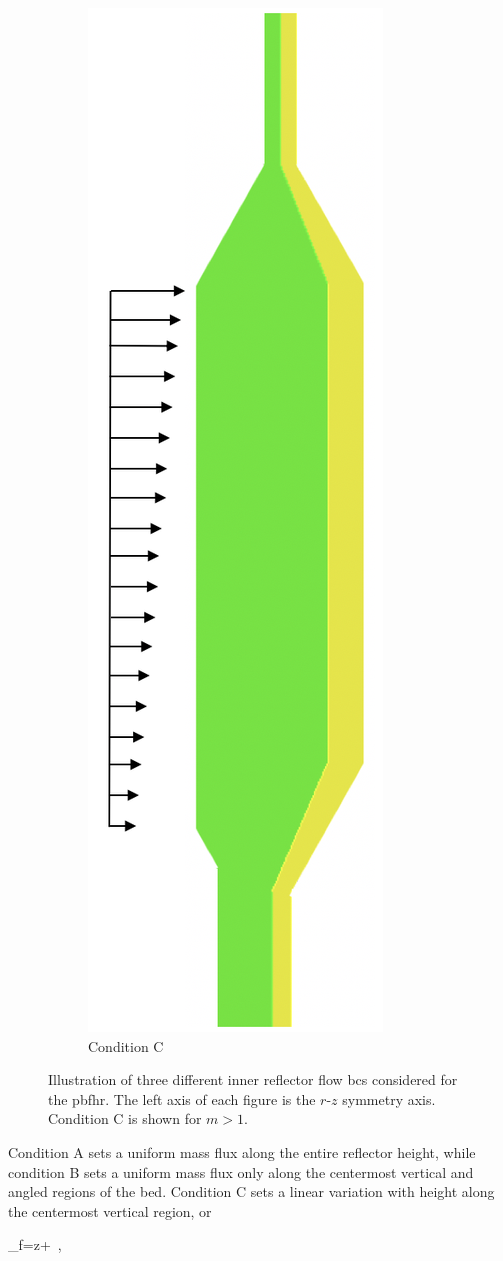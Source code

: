 \begin{figure}[!htb]
\begin{subfigure}{.32\textwidth}
  \includegraphics[height=1.5\linewidth]{figs/bc_C.png}
  \caption{Condition C}
\end{subfigure}
\caption{Illustration of three different inner reflector flow \glspl{bc} considered for the \gls{pbfhr}. The left axis of each figure is the $r$-$z$ symmetry axis. Condition C is shown for \(m>1\).}
\label{fig:bcs}
\end{figure}

Condition A sets a uniform mass flux along the entire reflector height, while condition B sets a uniform mass flux only along the centermost vertical and angled regions of the bed. Condition C sets a linear variation with height along the centermost vertical region, or

\beq
\label{eq:MassFluxBC}
\rho_f=z+\ ,
\eeq

